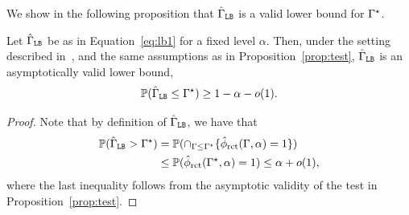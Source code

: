  
We show in the following proposition that $\hat{\Gamma}_{\texttt{LB}}$ is a valid lower bound for $\Gamma^{\star}$. 
\begin{prop}
Let $\hat{\Gamma}_{\texttt{LB}}$ be as in Equation~\eqref{eq:lb1} for a fixed level $\alpha$.
Then, under the setting described in~, and the same assumptions as in Proposition~\ref{prop:test},  
$\hat{\Gamma}_{\texttt{LB}}$ is an asymptotically valid lower bound, 
$$\mathbb{P} (\hat{\Gamma}_{\texttt{LB}} \leq \Gamma^{\star}) \geq 1-\alpha - o(1).$$
\end{prop}
\begin{proof}
Note that by definition of $\hat{\Gamma}_{\texttt{LB}}$, we have that
\begin{align*}
    \mathbb{P} (\hat{\Gamma}_{\texttt{LB}} > \Gamma^{\star}) &= \mathbb{P} (\cap_{\Gamma \leq \Gamma^{\star}} \{\hat{\phi}_{\mathrm{rct}}(\Gamma, \alpha) =1\}) \\
    &\leq \mathbb{P}(\hat{\phi}_{\mathrm{rct}} (\Gamma^{\star},\alpha) =1) \leq \alpha + o(1),
\end{align*}
where the last inequality follows from the asymptotic validity of the test in Proposition~\ref{prop:test}. 
\end{proof}
